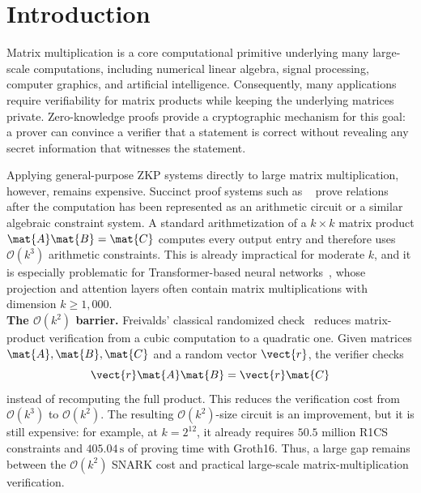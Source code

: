 \section{Introduction}
\label{sec:intro}

Matrix multiplication is a core computational primitive underlying many large-scale computations, including numerical linear algebra, signal processing, computer graphics, and artificial intelligence.  Consequently, many applications require verifiability for matrix products while keeping the underlying matrices private.  Zero-knowledge proofs provide a cryptographic mechanism for this goal:
a prover can convince a verifier that a statement is correct without revealing any secret information that witnesses the statement.

Applying general-purpose ZKP systems directly to large matrix multiplication, however, remains expensive.  Succinct proof systems such as ~\cite{groth2016size, plonk, maller2019sonic, chiesa2020marlin} prove relations after the computation has been represented as an arithmetic circuit or a similar algebraic constraint system.  
A standard arithmetization of a \(k\times k\) matrix product \(\mat{A}\mat{B}=\mat{C}\) computes every output
entry and therefore uses \(\mathcal{O}(k^3)\) arithmetic constraints.  This is
already impractical for moderate \(k\), and it is especially problematic for
Transformer-based neural networks~\cite{transformer, bert, GPT3}, whose projection and attention layers often
contain matrix multiplications with dimension \(k\ge 1{,}000\). \\

\noindent\textbf{The \(\mathcal{O}(k^2)\) barrier.}
Freivalds' classical randomized check~\cite{freivalds1977probabilistic} reduces
matrix-product verification from a cubic computation to a quadratic one.  Given
matrices \(\mat{A},\mat{B},\mat{C}\) and a random vector \(\vect{r}\), the
verifier checks
\[
  \vect{r}\mat{A}\mat{B}=\vect{r}\mat{C}
\]
instead of recomputing the full product.  This reduces the verification cost
from \(\mathcal{O}(k^3)\) to \(\mathcal{O}(k^2)\).  The resulting
\(\mathcal{O}(k^2)\)-size circuit is an improvement, but it is still expensive:
for example, at \(k=2^{12}\), it already requires \(50.5\) million R1CS
constraints and \(405.04\,\text{s}\) of proving time with Groth16.  Thus, a large gap remains
between the \(\mathcal{O}(k^2)\) SNARK cost and practical large-scale
matrix-multiplication verification. \\

